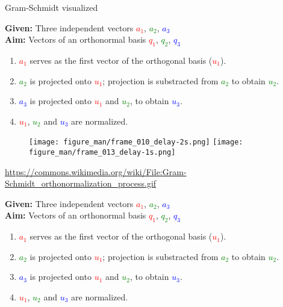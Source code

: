 \documentclass[11pt,compress,t,notes=noshow, xcolor=table]{beamer}
\begin{document}
\begin{vbframe}{Gram-Schmidt visualized}

\begin{scriptsize}

\textbf{Given:} Three independent vectors \textcolor{red}{$a_1$}, \textcolor{green}{$a_2$}, \textcolor{blue}{$a_3$} \\
\textbf{Aim:} Vectors of an orthonormal basis \textcolor{red}{$q_1$}, \textcolor{green}{$q_2$}, \textcolor{blue}{$q_3$}

\begin{enumerate}
  \item \textcolor{red}{$a_1$} serves as the first vector of the orthogonal basis (\textcolor{red}{$u_1$}).
  \item<2-> \textcolor{green}{$a_2$} is projected onto \textcolor{red}{$u_1$}; projection is substracted from \textcolor{green}{$a_2$}
        to obtain \textcolor{green}{$u_2$}.
  \item<3-> \textcolor{blue}{$a_3$} is projected onto \textcolor{red}{$u_1$} and \textcolor{green}{$u_2$},
        to obtain \textcolor{blue}{$u_3$}.
  \item<4-> \textcolor{red}{$u_1$}, \textcolor{green}{$u_2$} and \textcolor{blue}{$u_3$} are normalized.
\end{enumerate}

\end{scriptsize}

\begin{figure}
  \centering
  \texttt{[image: figure\_man/frame\_010\_delay-2s.png]}
  \texttt{[image: figure\_man/frame\_013\_delay-1s.png]}
\end{figure}
\tiny{\url{https://commons.wikimedia.org/wiki/File:Gram-Schmidt_orthonormalization_process.gif}}

\framebreak

\begin{scriptsize}

\textbf{Given:} Three independent vectors \textcolor{red}{$a_1$}, \textcolor{green}{$a_2$}, \textcolor{blue}{$a_3$} \\
\textbf{Aim:} Vectors of an orthonormal basis \textcolor{red}{$q_1$}, \textcolor{green}{$q_2$}, \textcolor{blue}{$q_3$}

\begin{enumerate}
  \item<2-> \textcolor{red}{$a_1$} serves as the first vector of the orthogonal basis (\textcolor{red}{$u_1$}).
  \item \textcolor{green}{$a_2$} is projected onto \textcolor{red}{$u_1$}; projection is substracted from \textcolor{green}{$a_2$}
        to obtain \textcolor{green}{$u_2$}.
  \item<3-> \textcolor{blue}{$a_3$} is projected onto \textcolor{red}{$u_1$} and \textcolor{green}{$u_2$},
        to obtain \textcolor{blue}{$u_3$}.
  \item<4-> \textcolor{red}{$u_1$}, \textcolor{green}{$u_2$} and \textcolor{blue}{$u_3$} are normalized.
\end{enumerate}


\end{scriptsize}
\end{vbframe}
\end{document}
